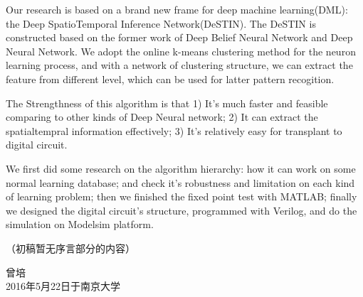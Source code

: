 \documentclass[winfonts]{njuthesis}
\begin{document}
\begin{englishabstract}
Our research is based on a brand new frame for deep machine learning(DML): the Deep SpatioTemporal Inference Network(DeSTIN). The DeSTIN is constructed based on the former work of Deep Belief Neural Network and Deep Neural Network. We adopt the online k-means clustering method for the neuron learning process, and with a network of clustering structure, we can extract the feature from different level, which can be used for latter pattern recogition.

The Strengthness of this algorithm is that 1) It's much faster and feasible comparing to other kinds of Deep Neural network; 2) It can extract the spatialtempral information effectively; 3) It's relatively easy for transplant to digital circuit.

We first did some research on the algorithm hierarchy: how it can work on some normal learning database; and check it's robustness and limitation on each kind of learning problem; then we finished the fixed point test with MATLAB; finally we designed the digital circuit's structure, programmed with Verilog, and do the simulation on Modelsim platform.
\end{englishabstract}

%
\begin{preface}

（初稿暂无序言部分的内容）


\vspace{1cm}
\begin{flushright}
曾培\\
2016年5月22日于南京大学
\end{flushright}

\end{preface}

\tableofcontents

\listoffigures

\listoftables
\end{document}
